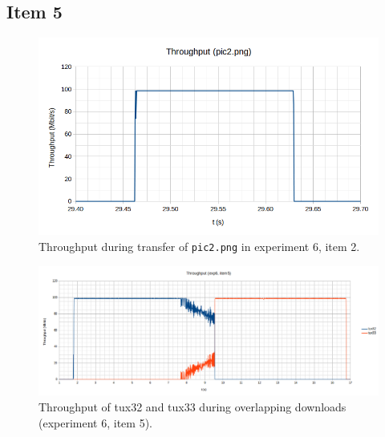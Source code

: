 \documentclass[a4paper, 11pt]{report}
\begin{document}
\begin{landscape}
\setcounter{subsection}{4}
\subsection{Item 5}


\end{landscape}

\begin{landscape}


\end{landscape}

\restoregeometry

\begin{figure}[H]
    \centering
    \includegraphics[width=0.6\linewidth]{6-2-tux33-pic2-throughput.png}
    \caption{Throughput during transfer of \texttt{pic2.png} in experiment 6, item 2.}
    \label{fig:6-2-tux33-pic2-throughput}
\end{figure}

\begin{figure}[H]
    \centering
    \includegraphics[width=\linewidth]{exp6_item5_hist.png}
    \caption{Throughput of tux32 and tux33 during overlapping downloads (experiment 6, item 5).}
    \label{fig:exp6_item5}
\end{figure}
\end{document}

